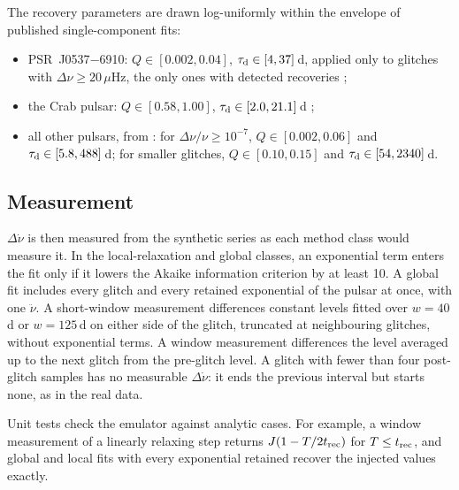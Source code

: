 \documentclass[fleqn,usenatbib]{mnras}
\newcommand{\dnu}{\Delta\nu/\nu}
\newcommand{\psr}[1]{PSR~#1}
\begin{document}
The recovery parameters are drawn log-uniformly within the envelope of
published single-component fits:
\begin{itemize}
\item \psr{J0537$-$6910}: $Q\in[0.002,0.04]$, $\tau_{\rm d}\in[4,37]$\,d,
applied only to glitches with $\Delta\nu\geq20\,\mu$Hz, the only ones with
detected recoveries \citep{zubieta2026};
\item the Crab pulsar: $Q\in[0.58,1.00]$, $\tau_{\rm d}\in[2.0,21.1]$\,d
\citep{wong2001,wang2012};
\item all other pulsars, from \citet{lower2021}: for $\dnu\geq10^{-7}$,
$Q\in[0.002,0.06]$ and $\tau_{\rm d}\in[5.8,488]$\,d; for smaller glitches,
$Q\in[0.10,0.15]$ and $\tau_{\rm d}\in[54,2340]$\,d.
\end{itemize}

\subsection{Measurement}
$\Delta\dot\nu$ is then measured from the synthetic series as each method
class would measure it. In the local-relaxation and global classes, an
exponential term enters the fit only if it lowers the Akaike information
criterion by at least 10. A global fit includes every glitch and every
retained exponential of the pulsar at once, with one $\ddot\nu$. A
short-window measurement differences constant levels fitted over $w=40$\,d
\citep[the post-glitch span of][]{espinoza2011} or $w=125$\,d
\citep{wang2000} on either side of the glitch, truncated at neighbouring
glitches, without exponential terms. A window measurement differences the
level averaged up to the next glitch from the pre-glitch level. A glitch
with fewer than four post-glitch samples has no measurable $\Delta\dot\nu$:
it ends the previous interval but starts none, as in the real data.

Unit tests check the emulator against analytic cases. For example, a window
measurement of a linearly relaxing step returns $J(1-T/2t_{\rm rec})$ for
$T\leq t_{\rm rec}$, and global and local fits with every exponential
retained recover the injected values exactly.
\end{document}

